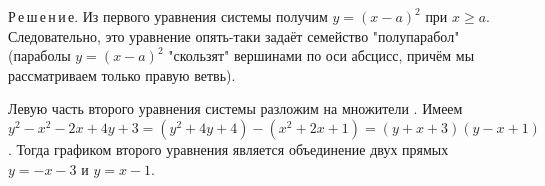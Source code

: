 \documentclass{article}
\begin{document}
Р\,е\,ш\,е\,н\,и\,е. Из первого уравнения системы получим $y = (x-a)^2$ при $x \geq a$. Следовательно, это уравнение опять-таки задаёт семейство "полупарабол" (параболы $y = (x - a)^2$ "скользят" вершинами по оси абсцисс, причём мы рассматриваем только правую ветвь).
 
Левую часть второго уравнения системы разложим на множители . Имеем $ y^2 - x^2 - 2x + 4y + 3 = (y^2 + 4y + 4) - (x^2 + 2x + 1) = (y + x + 3)(y - x + 1)$.
Тогда графиком второго уравнения является объединение двух прямых $y = -x - 3$ и $y = x - 1$. 
  
  
\end{document}
